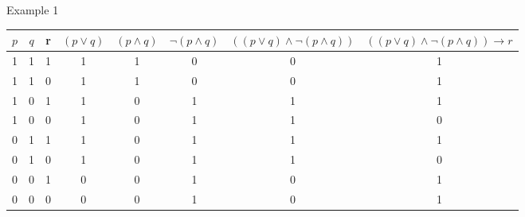 \begin{frame}{Example 1}

\begin{center}
\end{center}

{\tiny
\begin{tabular}{c c c | c | c | c | c | c }
$p$ & $q$  & r & $(p\lor q)$ & $(p\land q)$ &  $\neg (p\land q)$ & $((p\lor q)\land \neg(p\land q))$ & $((p\lor q)\land \neg(p\land q))\to r$ \\\hline

1 & 1 & 1 & 1 &1&0&  0 & 1\\

1 & 1 & 0 & 1 &1&0&  0& 1\\

1 & 0 & 1 & 1 &0&1& 1& 1\\

1 & 0 & 0  & 1 &0& 1&1& 0\\

0 & 1 &  1 & 1 &0& 1 &1 & 1\\

0 & 1 & 0 & 1 &0&1& 1 & 0\\

0 & 0 & 1 & 0 &0& 1 &0& 1\\

0 & 0 & 0 & 0 &0&1 &0& 1

\end{tabular}}

\end{frame}

